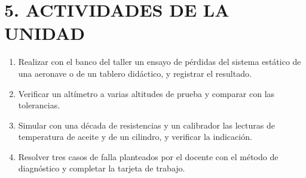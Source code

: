 \section*{5. ACTIVIDADES DE LA UNIDAD}
\begin{enumerate}
  \item Realizar con el banco del taller un ensayo de pérdidas del sistema estático de una
        aeronave o de un tablero didáctico, y registrar el resultado.
  \item Verificar un altímetro a varias altitudes de prueba y comparar con las tolerancias.
  \item Simular con una década de resistencias y un calibrador las lecturas de temperatura de
        aceite y de un cilindro, y verificar la indicación.
  \item Resolver tres casos de falla planteados por el docente con el método de diagnóstico y
        completar la tarjeta de trabajo.
\end{enumerate}
